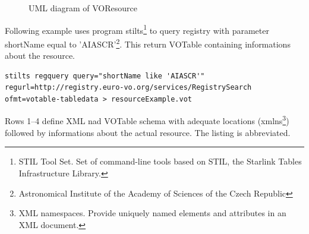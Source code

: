 \begin{figure}[!htbp]
\begin{center}
        \fi
        \caption{UML diagram of VOResource}
        \label{FigResource}
      \end{center}
    \end{figure}

\clearpage

Following example uses program stilts\footnote{STIL Tool Set. Set of
  command-line tools based on STIL, the Starlink Tables Infrastructure
  Library.} to query registry with parameter shortName equal to
'AIASCR'\footnote{Astronomical Institute of the Academy of Sciences of
  the Czech Republic}. This return VOTable containing informations
about the resource. 

\begin{lstlisting}[frame=single]
stilts regquery query="shortName like 'AIASCR'"
regurl=http://registry.euro-vo.org/services/RegistrySearch
ofmt=votable-tabledata > resourceExample.vot
\end{lstlisting}

Rows 1--4 define XML nad VOTable schema with adequate locations
(xmlns\footnote{XML namespaces. Provide uniquely named elements and
  attributes in an XML document.}) followed by informations about the
actual resource. The listing is abbreviated.

  

    

    




